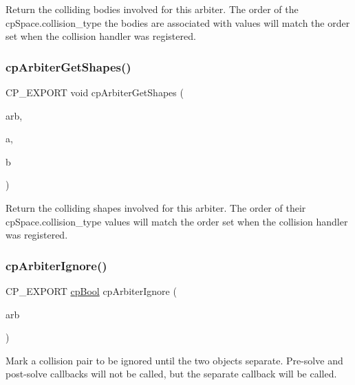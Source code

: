 Return the colliding bodies involved for this arbiter. The order of the cp\+Space.\+collision\+\_\+type the bodies are associated with values will match the order set when the collision handler was registered. \mbox{\label{group__cp_arbiter_ga521ac495c53bf25ab061a79643bb195a}} 
\subsubsection{\texorpdfstring{cp\+Arbiter\+Get\+Shapes()}{cpArbiterGetShapes()}}
{\footnotesize\ttfamily C\+P\+\_\+\+E\+X\+P\+O\+RT void cp\+Arbiter\+Get\+Shapes (\begin{DoxyParamCaption}\item[{const \mbox{\hyperlink{structcp_arbiter}{cp\+Arbiter}} $\ast$}]{arb,  }\item[{\mbox{\hyperlink{structcp_shape}{cp\+Shape}} $\ast$$\ast$}]{a,  }\item[{\mbox{\hyperlink{structcp_shape}{cp\+Shape}} $\ast$$\ast$}]{b }\end{DoxyParamCaption})}

Return the colliding shapes involved for this arbiter. The order of their cp\+Space.\+collision\+\_\+type values will match the order set when the collision handler was registered. \mbox{\label{group__cp_arbiter_ga7a643cd465bdb61b2f686fdf3558b263}} 
\subsubsection{\texorpdfstring{cp\+Arbiter\+Ignore()}{cpArbiterIgnore()}}
{\footnotesize\ttfamily C\+P\+\_\+\+E\+X\+P\+O\+RT \mbox{\hyperlink{group__basic_types_gabc5e752c48f3449ca26ef413ecbd647e}{cp\+Bool}} cp\+Arbiter\+Ignore (\begin{DoxyParamCaption}\item[{\mbox{\hyperlink{structcp_arbiter}{cp\+Arbiter}} $\ast$}]{arb }\end{DoxyParamCaption})}

Mark a collision pair to be ignored until the two objects separate. Pre-\/solve and post-\/solve callbacks will not be called, but the separate callback will be called. \mbox{\label{group__cp_arbiter_ga2a68f589f58dbae29de18cebee3de02d}} 
